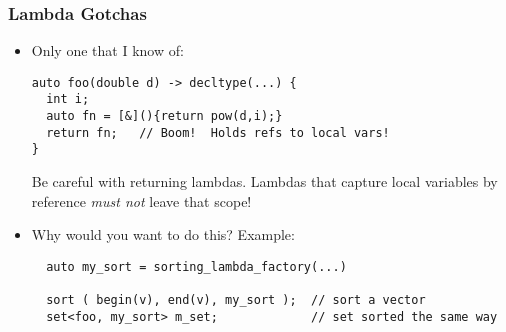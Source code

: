 \begin{frame}[fragile,t]
\frametitle{Lambda Gotchas}
\begin{itemize}
\item Only one that I know of:
{\scriptsize
\begin{verbatim}
auto foo(double d) -> decltype(...) {
  int i;
  auto fn = [&](){return pow(d,i);}
  return fn;   // Boom!  Holds refs to local vars!
}
\end{verbatim}}

Be careful with returning lambdas.  Lambdas that capture local
variables by reference \emph{must not} leave that scope!

\vskip 18pt


\item Why would you want to do this?  Example:
{\scriptsize
\begin{verbatim}
  auto my_sort = sorting_lambda_factory(...)

  sort ( begin(v), end(v), my_sort );  // sort a vector
  set<foo, my_sort> m_set;             // set sorted the same way
\end{verbatim}
}

\end{itemize}
\end{frame}


